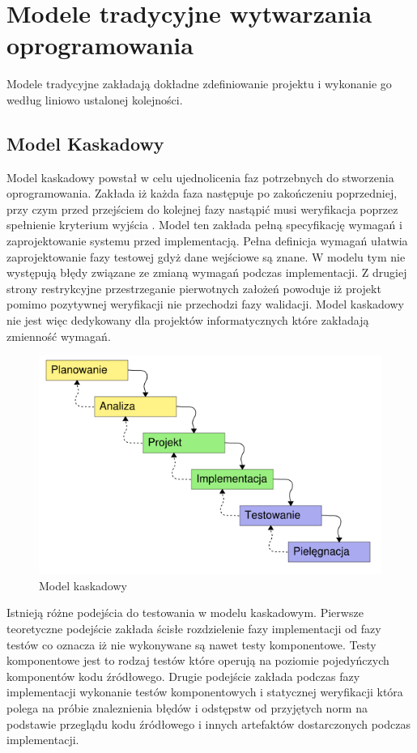 \section{Modele tradycyjne wytwarzania oprogramowania}
Modele tradycyjne zakładają dokładne zdefiniowanie projektu i wykonanie go według liniowo ustalonej kolejności.
\subsection{Model Kaskadowy}
Model kaskadowy powstał w celu ujednolicenia faz potrzebnych do stworzenia oprogramowania. Zakłada iż każda faza następuje po zakończeniu poprzedniej, przy czym przed przejściem do kolejnej fazy nastąpić musi weryfikacja poprzez spełnienie kryterium wyjścia \cite{SEaT}. Model ten zakłada pełną specyfikację wymagań i zaprojektowanie systemu przed implementacją. Pełna definicja wymagań ułatwia zaprojektowanie fazy testowej gdyż dane wejściowe są znane. W modelu tym nie występują błędy związane ze zmianą wymagań podczas implementacji. Z drugiej strony restrykcyjne przestrzeganie pierwotnych założeń powoduje iż projekt pomimo pozytywnej weryfikacji nie przechodzi fazy walidacji. Model kaskadowy nie jest więc dedykowany dla projektów informatycznych które zakładają zmienność wymagań.
\begin{figure}[h]
\centerline{\includegraphics[scale=0.5]{img/model_kaskadowy.png}}
\caption{Model kaskadowy}
\label{fig:kaskadowy}
\end{figure}

Istnieją różne podejścia do testowania w modelu kaskadowym. Pierwsze teoretyczne podejście zakłada ścisłe rozdzielenie fazy implementacji od fazy testów co oznacza iż nie wykonywane są nawet testy komponentowe. Testy komponentowe jest to rodzaj testów które operują na poziomie pojedyńczych komponentów kodu źródłowego. Drugie podejście zakłada podczas fazy implementacji wykonanie testów komponentowych i statycznej weryfikacji która polega na próbie znaleznienia błędów i odstępstw od przyjętych norm na podstawie przeglądu kodu źródłowego i innych artefaktów dostarczonych podczas implementacji.

